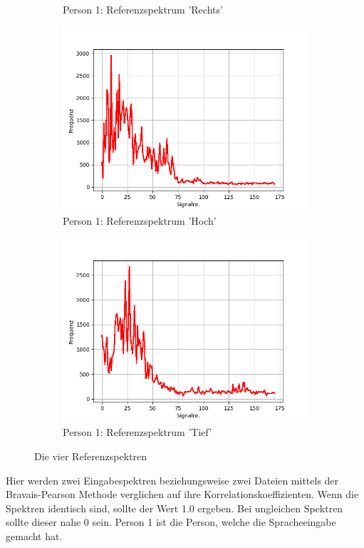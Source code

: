 \documentclass[12pt, oneside, a4paper, \docLanguage]{report}
\begin{document}
\begin{figure}[H]
\begin{subfigure}{.5\textwidth}
  		\caption{Person 1: Referenzspektrum 'Rechts'}
  		\label{fig:sub2}
	\end{subfigure}
\begin{subfigure}{.5\textwidth}
  		\centering
 		 \includegraphics[width=.95\linewidth]{../data/img/Versuch2/2Averagehoch.png}
  		\caption{Person 1: Referenzspektrum 'Hoch'}
 		 \label{fig:sub3}
	\end{subfigure}%
	\begin{subfigure}{.5\textwidth}
  		\centering
 		 \includegraphics[width=.95\linewidth]{../data/img/Versuch2/2Averagetief.png}
  		\caption{Person 1: Referenzspektrum 'Tief'}
  		\label{fig:sub4}
	\end{subfigure}
	\caption{Die vier Referenzspektren}
	\label{fig:test}
\end{figure}
\newpage
Hier werden zwei Eingabespektren beziehungsweise zwei Dateien mittels der Bravais-Pearson Methode verglichen auf ihre Korrelationskoeffizienten.
Wenn die Spektren identisch sind, sollte der Wert 1.0 ergeben. Bei ungleichen Spektren sollte dieser nahe 0 sein.
Person 1 ist die Person, welche die Spracheeingabe gemacht hat.
\end{document}
